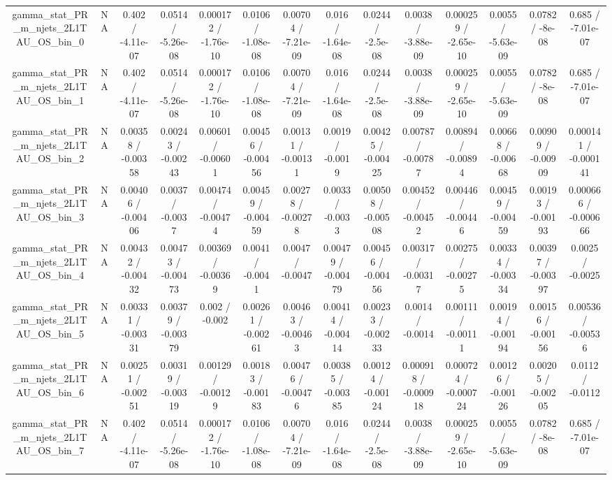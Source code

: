 \documentclass[10pt]{article}
\begin{document}
\begin{table}[htbp]
\begin{center}
\begin{tabular}{|c|c|c|c|c|c|c|c|c|c|c|c|c|c|}
  gamma_stat_PR_m_njets_2L1TAU_OS_bin_0 &    NA    & 0.402 / -4.11e-07 & 0.0514 / -5.26e-08 & 0.000172 / -1.76e-10 & 0.0106 / -1.08e-08 & 0.00704 / -7.21e-09 & 0.016 / -1.64e-08 & 0.0244 / -2.5e-08 & 0.0038 / -3.88e-09 & 0.000259 / -2.65e-10 & 0.0055 / -5.63e-09 & 0.0782 / -8e-08 & 0.685 / -7.01e-07 \\ 
  gamma_stat_PR_m_njets_2L1TAU_OS_bin_1 &    NA    & 0.402 / -4.11e-07 & 0.0514 / -5.26e-08 & 0.000172 / -1.76e-10 & 0.0106 / -1.08e-08 & 0.00704 / -7.21e-09 & 0.016 / -1.64e-08 & 0.0244 / -2.5e-08 & 0.0038 / -3.88e-09 & 0.000259 / -2.65e-10 & 0.0055 / -5.63e-09 & 0.0782 / -8e-08 & 0.685 / -7.01e-07 \\ 
  gamma_stat_PR_m_njets_2L1TAU_OS_bin_2 &    NA    & 0.00358 / -0.00358 & 0.00243 / -0.00243 & 0.00601 / -0.00601 & 0.00456 / -0.00456 & 0.00131 / -0.00131 & 0.0019 / -0.0019 & 0.00425 / -0.00425 & 0.00787 / -0.00787 & 0.00894 / -0.00894 & 0.00668 / -0.00668 & 0.00909 / -0.00909 & 0.000141 / -0.000141 \\ 
  gamma_stat_PR_m_njets_2L1TAU_OS_bin_3 &    NA    & 0.00406 / -0.00406 & 0.0037 / -0.0037 & 0.00474 / -0.00474 & 0.00459 / -0.00459 & 0.00278 / -0.00278 & 0.0033 / -0.0033 & 0.00508 / -0.00508 & 0.00452 / -0.00452 & 0.00446 / -0.00446 & 0.00459 / -0.00459 & 0.00193 / -0.00193 & 0.000666 / -0.000666 \\ 
  gamma_stat_PR_m_njets_2L1TAU_OS_bin_4 &    NA    & 0.00432 / -0.00432 & 0.00473 / -0.00473 & 0.00369 / -0.00369 & 0.0041 / -0.0041 & 0.0047 / -0.0047 & 0.00479 / -0.00479 & 0.00456 / -0.00456 & 0.00317 / -0.00317 & 0.00275 / -0.00275 & 0.00334 / -0.00334 & 0.00397 / -0.00397 & 0.0025 / -0.0025 \\ 
  gamma_stat_PR_m_njets_2L1TAU_OS_bin_5 &    NA    & 0.00331 / -0.00331 & 0.00379 / -0.00379 & 0.002 / -0.002 & 0.00261 / -0.00261 & 0.00463 / -0.00463 & 0.00414 / -0.00414 & 0.00233 / -0.00233 & 0.0014 / -0.0014 & 0.00111 / -0.00111 & 0.00194 / -0.00194 & 0.00156 / -0.00156 & 0.00536 / -0.00536 \\ 
  gamma_stat_PR_m_njets_2L1TAU_OS_bin_6 &    NA    & 0.00251 / -0.00251 & 0.00319 / -0.00319 & 0.00129 / -0.00129 & 0.00183 / -0.00183 & 0.00476 / -0.00476 & 0.00385 / -0.00385 & 0.00124 / -0.00124 & 0.000918 / -0.000918 & 0.000724 / -0.000724 & 0.00126 / -0.00126 & 0.00205 / -0.00205 & 0.0112 / -0.0112 \\ 
  gamma_stat_PR_m_njets_2L1TAU_OS_bin_7 &    NA    & 0.402 / -4.11e-07 & 0.0514 / -5.26e-08 & 0.000172 / -1.76e-10 & 0.0106 / -1.08e-08 & 0.00704 / -7.21e-09 & 0.016 / -1.64e-08 & 0.0244 / -2.5e-08 & 0.0038 / -3.88e-09 & 0.000259 / -2.65e-10 & 0.0055 / -5.63e-09 & 0.0782 / -8e-08 & 0.685 / -7.01e-07 \\ 

\end{tabular}
\end{center}
\end{table}
\end{document}
